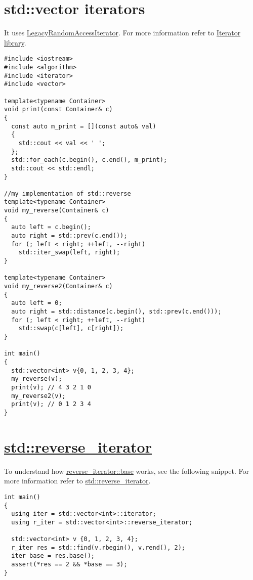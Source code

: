 \documentclass{book}
\begin{document}
	\section{std::vector iterators}
	It uses \href{https://en.cppreference.com/w/cpp/named_req/RandomAccessIterator}{LegacyRandomAccessIterator}. For more information refer to \href{https://en.cppreference.com/w/cpp/iterator}{Iterator library}.
	\begin{lstlisting}
#include <iostream>
#include <algorithm>
#include <iterator>
#include <vector>

template<typename Container>
void print(const Container& c)
{
  const auto m_print = [](const auto& val)
  {
    std::cout << val << ' ';
  };
  std::for_each(c.begin(), c.end(), m_print);
  std::cout << std::endl;
}

//my implementation of std::reverse 
template<typename Container>
void my_reverse(Container& c)
{
  auto left = c.begin();
  auto right = std::prev(c.end());
  for (; left < right; ++left, --right)
    std::iter_swap(left, right);
}

template<typename Container>
void my_reverse2(Container& c)
{
  auto left = 0;
  auto right = std::distance(c.begin(), std::prev(c.end()));
  for (; left < right; ++left, --right)
    std::swap(c[left], c[right]);
}

int main()
{
  std::vector<int> v{0, 1, 2, 3, 4};
  my_reverse(v);
  print(v); // 4 3 2 1 0 
  my_reverse2(v);
  print(v); // 0 1 2 3 4
}
	\end{lstlisting}
	\section{\href{https://en.cppreference.com/w/cpp/iterator/reverse_iterator}{std::reverse\_iterator}}
	\label{appendix:reverse_iterator}
	 To understand how \href{https://en.cppreference.com/w/cpp/iterator/reverse_iterator/base}{reverse\_iterator::base} works, see the following snippet. For more information refer to \href{https://en.cppreference.com/w/cpp/iterator/reverse_iterator}{std::reverse\_iterator}.
	\begin{lstlisting}
int main()
{
  using iter = std::vector<int>::iterator;
  using r_iter = std::vector<int>::reverse_iterator;

  std::vector<int> v {0, 1, 2, 3, 4};
  r_iter res = std::find(v.rbegin(), v.rend(), 2);
  iter base = res.base();
  assert(*res == 2 && *base == 3);
}
	\end{lstlisting}
\end{document}
